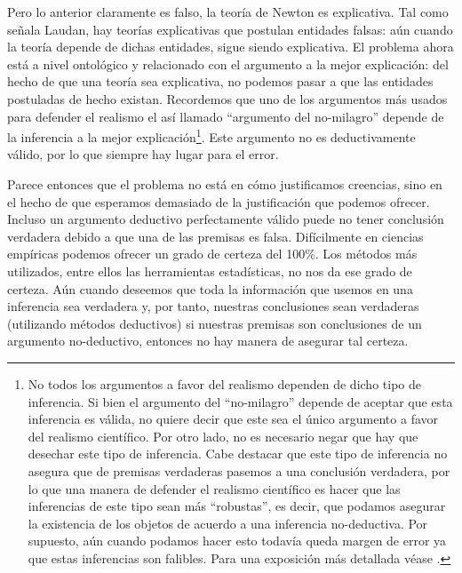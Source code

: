\documentclass[12pt]{article}
\begin{document}
Pero lo anterior claramente es falso, la teoría de Newton es explicativa. Tal como señala Laudan, hay teorías explicativas que postulan entidades falsas: aún cuando la teoría depende de dichas entidades, sigue siendo explicativa. El problema ahora está a nivel ontológico y relacionado con el argumento a la mejor explicación: del hecho de que una teoría sea explicativa, no podemos pasar a que las entidades postuladas de hecho existan. Recordemos que uno de los argumentos más usados para defender el realismo el así llamado ``argumento del no-milagro'' depende de la inferencia a la mejor explicación\footnote{No todos los argumentos a favor del realismo dependen de dicho tipo de inferencia. Si bien el argumento del ``no-milagro'' depende de aceptar que esta inferencia es válida, no quiere decir que este sea el único argumento a favor del realismo científico. Por otro lado, no es necesario negar que hay que desechar este tipo de inferencia. Cabe destacar que este tipo de inferencia no asegura que de premisas verdaderas pasemos a una conclusión verdadera, por lo que una manera de defender el realismo científico es hacer que las inferencias de este tipo sean más ``robustas'', es decir, que podamos asegurar la existencia de los objetos de acuerdo a una inferencia no-deductiva. Por supuesto, aún cuando podamos hacer esto todavía queda margen de error ya que estas inferencias son falibles. Para una exposición más detallada véase \cite{Saatsi2010-SAAFVC-2}.}. Este argumento no es deductivamente válido, por lo que siempre hay lugar para el error.

Parece entonces que el problema no está en cómo justificamos creencias, sino en el hecho de que esperamos demasiado de la justificación que podemos ofrecer. Incluso un argumento deductivo perfectamente válido puede no tener conclusión verdadera debido a que una de las premisas es falsa. Difícilmente en ciencias empíricas podemos ofrecer un grado de certeza del 100\%. Los métodos más utilizados, entre ellos las herramientas estadísticas, no nos da ese grado de certeza. Aún cuando deseemos que toda la información que usemos en una inferencia sea verdadera y, por tanto, nuestras conclusiones sean verdaderas (utilizando métodos deductivos) si nuestras premisas son conclusiones de un argumento no-deductivo, entonces no hay manera de asegurar tal certeza. 

\end{document}
